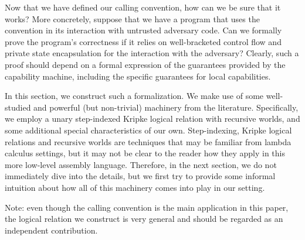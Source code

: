\documentclass[format=acmsmall, review=false, screen=true]{acmart}
\newenvironment{toplas}
    {\color{OliveGreen}
          
    }{}
\begin{document}

\begin{toplas}
Now that we have defined our calling convention, how can we be sure that it
works? More concretely, suppose that we have a program that uses the convention
in its interaction with untrusted adversary code. Can we formally prove the
program's correctness if it relies on well-bracketed control flow and private
state encapsulation for the interaction with the adversary? Clearly, such a
proof should depend on a formal expression of the guarantees provided by the
capability machine, including the specific guarantees for local capabilities.

In this section, we construct such a formalization. We make use of some
well-studied and powerful (but non-trivial) machinery from the literature.
Specifically, we employ a unary step-indexed Kripke logical relation with
recursive worlds, and some additional special characteristics of our own.
Step-indexing, Kripke logical relations and recursive worlds are techniques that
may be familiar from lambda calculus settings, but it may not be clear to the
reader how they apply in this more low-level assembly language. Therefore, in the next section, we do
not immediately dive into the details, but we first try to provide some informal
intuition about how all of this machinery comes into play in our setting.

Note: even though the calling convention is the main application in this paper,
the logical relation we construct is very general and should be regarded as an
independent contribution.


\end{toplas}
\end{document}
